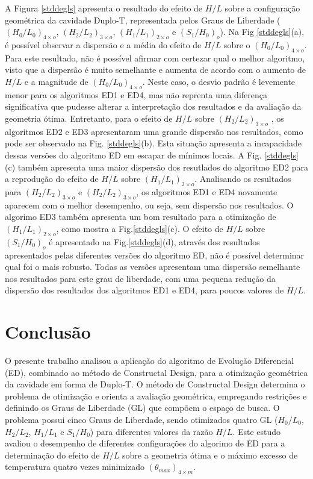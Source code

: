 \documentclass[12pt,A4,A4pt]{article}
\begin{document}
\hspace{0.5cm} A Figura \ref{stddegls} apresenta o resultado do efeito de $H/L$ sobre a configuração geométrica da cavidade Duplo-T, representada pelos Graus de Liberdade ( ${(H_{0}/L_{0})_{4\times o}}$,  ${(H_{2}/L_{2})_{3\times o}}$, ${(H_{1}/L_{1})_{2\times o}}$ e ${(S_{1}/H_{0})_{o}}$). Na Fig \ref{stddegls}(a), é possível observar a dispersão e a média do efeito de  $H/L$ sobre o ${(H_{0}/L_{0})_{4\times o}}$. Para este resultado, não é possível afirmar com certezar qual o melhor algoritmo, visto que a dispersão é muito semelhante e aumenta de acordo com o aumento de $H/L$ e a magnitude de ${(H_{0}/L_{0})_{4\times o}}$. Neste caso, o desvio padrão é levemente menor para os algoritmos ED1 e ED4, mas não reprenta uma diferença significativa que pudesse alterar a interpretação dos resultados e da avaliação da geometria ótima. Entretanto, para o efeito de $H/L$ sobre ${(H_{2}/L_{2})_{3\times o}}$	, os algoritmos ED2 e ED3 apresentaram uma grande dispersão nos resultados, como pode ser observado na Fig. \ref{stddegls}(b). Esta situação apresenta a incapacidade dessas versões do algoritmo ED em escapar de mínimos locais.  A Fig. \ref{stddegls}(c) também apresenta uma maior dispersão dos resutlados do algoritmo ED2 para a reprodução do efeito de $H/L$ sobre ${(H_{1}/L_{1})_{2\times o}}$. Analisando os resultados para  ${(H_{2}/L_{2})_{3\times o}}$ e ${(H_{2}/L_{2})_{3\times o}}$, os algoritmos ED1 e ED4 novamente aparecem com o melhor desempenho, ou seja, sem dispersão nos resultados. O algorimo ED3 também apresenta um bom resultado para a otimização de ${(H_{1}/L_{1})_{2\times o}}$, como mostra a Fig.\ref{stddegls}(c). O efeito de $H/L$ sobre ${(S_{1}/H_{0})_{o}}$ é apresentado na Fig.\ref{stddegls}(d), através dos resultados apresentados pelas diferentes versões do algoritmo ED, não é possível determinar qual foi o mais robusto. Todas as versões apresentam uma dispersão semelhante nos resultados para este grau de liberdade, com uma pequena redução da dispersão dos resultados dos algoritmos ED1 e ED4, para poucos valores de $H/L$.


\section{Conclusão}
\label{opt}
\hspace{0.5cm} O presente trabalho analisou a aplicação do algoritmo de Evolução Diferencial (ED), combinado ao método de Constructal Design, para a otimização geométrica da cavidade em forma de Duplo-T. O método de Constructal Design determina o problema de otimização e orienta a avaliação geométrica, empregando restrições e definindo os Graus de Liberdade (GL) que compõem o espaço de busca.  O problema possui cinco Graus de Liberdade, sendo otimizados quatro GL ($H_{0}/L_{0}$,  $H_{2}/L_{2}$, $H_{1}/L_{1}$ e $S_{1}/H_{0}$) para diferentes valores da razão $H/L$. Este estudo avaliou o desempenho de diferentes configurações do algorimo de ED para a determinação do efeito de $H/L$ sobre a geometria ótima e o máximo excesso de temperatura quatro vezes minimizado  $({\theta}_{max})_{4\times m}$.
\end{document}
